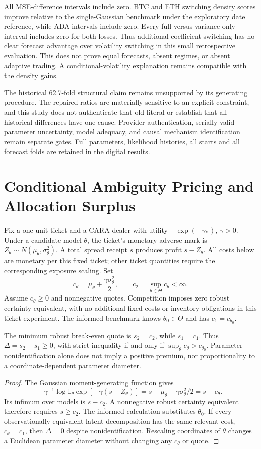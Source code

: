 All MSE-difference intervals include zero. BTC and ETH switching density scores improve relative to the single-Gaussian benchmark under the exploratory date reference, while ADA intervals include zero. Every full-versus-variance-only interval includes zero for both losses. Thus additional coefficient switching has no clear forecast advantage over volatility switching in this small retrospective evaluation. This does not prove equal forecasts, absent regimes, or absent adaptive trading. A conditional-volatility explanation remains compatible with the density gains.

The historical 62.7-fold structural claim remains unsupported by its generating procedure. The repaired ratios are materially sensitive to an explicit constraint, and this study does not authenticate that old literal or establish that all historical differences have one cause. Provider authentication, serially valid parameter uncertainty, model adequacy, and causal mechanism identification remain separate gates. Full parameters, likelihood histories, all starts and all forecast folds are retained in the digital results.


\section{Conditional Ambiguity Pricing and Allocation Surplus}
Fix a one-unit ticket and a CARA dealer with utility $-\exp(-\gamma\pi)$, $\gamma>0$. Under a candidate model $\theta$, the ticket's monetary adverse mark is $Z_\theta\sim N(\mu_\theta,\sigma_\theta^2)$. A total spread receipt $s$ produces profit $s-Z_\theta$. All costs below are monetary per this fixed ticket; other ticket quantities require the corresponding exposure scaling. Set
\[
c_\theta=\mu_\theta+\frac{\gamma\sigma_\theta^2}{2},\qquad
c_2=\sup_{\theta\in\Theta}c_\theta<\infty.
\]
Assume $c_\theta\ge0$ and nonnegative quotes. Competition imposes zero robust certainty equivalent, with no additional fixed costs or inventory obligations in this ticket experiment. The informed benchmark knows $\theta_0\in\Theta$ and has $c_1=c_{\theta_0}$.
\begin{proposition}
The minimum robust break-even quote is $s_2=c_2$, while $s_1=c_1$. Thus $\Delta=s_2-s_1\ge0$, with strict inequality if and only if $\sup_\theta c_\theta>c_{\theta_0}$. Parameter nonidentification alone does not imply a positive premium, nor proportionality to a coordinate-dependent parameter diameter.
\end{proposition}
\begin{proof}
The Gaussian moment-generating function gives
\[
-\gamma^{-1}\log\mathbb E_\theta\exp[-\gamma(s-Z_\theta)]
=s-\mu_\theta-\gamma\sigma_\theta^2/2=s-c_\theta.
\]
Its infimum over models is $s-c_2$. A nonnegative robust certainty equivalent therefore requires $s\ge c_2$. The informed calculation substitutes $\theta_0$. If every observationally equivalent latent decomposition has the same relevant cost, $c_\theta=c_1$, then $\Delta=0$ despite nonidentification. Rescaling coordinates of $\theta$ changes a Euclidean parameter diameter without changing any $c_\theta$ or quote.
\end{proof}

